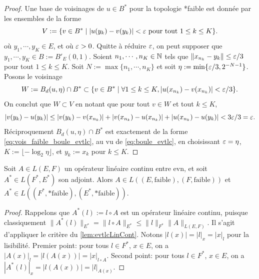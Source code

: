 \begin{proof}
	Une base de voisinages de $u \in B^*$ pour la topologie *faible est donnée par les ensembles de la forme
	\begin{equation}
	\label{eq:vois_faible_boule_evtlc}
		V := \{v\in B^* \mid |u(y_k)-v(y_k)| < \ve \text{ pour tout } 1 \leq k \leq K\}.
\leancheck{eq:vois_faible_boule_evtlc}%
	\end{equation}
	où $y_1,\cdots,y_K \in E$, et où $\varepsilon>0$. Quitte à réduire $\varepsilon$, on peut supposer que $y_1,\cdots,y_K\in B := B'_E(0,1)$.
	Soient $n_1,\cdots,n_K\in \mathbb{N}$ tels que $\|x_{n_k}-y_k\| \leq \varepsilon/3$ pour tout $1 \leq k \leq K$. Soit $N := \max\{n_1,\cdots,n_K\}$ et soit $\eta := \min \{\varepsilon/3, 2^{-N-1}\}$. Posons le voisinage
	\begin{equation}
		W := B_d(u,\eta) \cap B^* \subset \{v \in B^* \mid \forall 1 \leq k \leq K, |u(x_{n_k})-v(x_{n_k})| < \varepsilon/3\}. 
	\end{equation}
	On conclut que $W \subset V$ en notant que pour tout $v \in W$ et tout $k \leq K$, 
	\begin{equation}
		|v(y_k)-u(y_k)| \leq |v(y_k)-v(x_{n_k})| + |v(x_{n_k})-u(x_{n_k})| + |u(x_{n_k}) - u(y_k)| < 3 \varepsilon /3 = \varepsilon.
	\end{equation}
	Réciproquement $B_d(u,\eta) \cap B^*$ est exactement de la forme \eqref{eq:vois_faible_boule_evtlc}, au vu de \eqref{eq:boule_evtlc}, en choisissant $\varepsilon=\eta$, $K := \lfloor -\log_2 \eta\rfloor$, et $y_k := x_k$ pour $k\leq K$. 
\end{proof}



\begin{remark}
Soit $A \in L(E,F)$ un opérateur linéaire continu entre evn, et soit $A^*\in L(F^*,E^*)$ son adjoint. Alors $A \in L( (E,\text{faible}), (F,\text{faible}))$ et $A^*\in L( (F^*,\text{*faible}), (E^*, \text{*faible}))$.
\end{remark}

\begin{proof}
	Rappelons que $A^*(l) := l\circ A$ est un opérateur linéaire continu, puisque classiquement $\|A^*(l)\|_{E^*} = \|l\circ A\|_{E^*} \leq \|l\|_{F^*} \|A\|_{L(E,F)}$.
	Il s'agit d'appliquer le critère du \cref{lem:evtlcLinCont}. Notons $|l(x)| = |l|_x = |x|_l$ pour la lisibilité. Premier point: pour tous $l \in F^*$, $x \in E$, on a $|A(x)|_l = |l(A(x))| = |x|_{l\circ A}$.  Second point: pour tous $l \in F^*$, $x\in E$, on a $|A^*(l)|_x = |l(A(x))| = |l|_{A(x)}$.
\end{proof}

